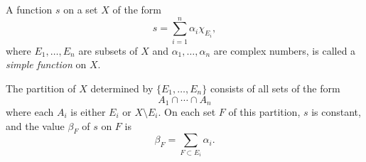A function $s$ on a set $X$ of the form
$$s = \sum_{i=1}^{n} \alpha_i \chi_{E_i},$$
where $E_1, \ldots, E_n$ are subsets of $X$ and $\alpha_1, \ldots, \alpha_n$ are complex numbers, is called a \textit{simple function} on $X$.

The partition of $X$ determined by $\{E_1, \ldots, E_n\}$ consists of all sets of the form
$$A_1 \cap \cdots \cap A_n$$
where each $A_i$ is either $E_i$ or $X \setminus E_i$. On each set $F$ of this partition, $s$ is constant, and the value $\beta_F$ of $s$ on $F$ is
$$\beta_F = \sum_{F \subset E_i} \alpha_i.$$

